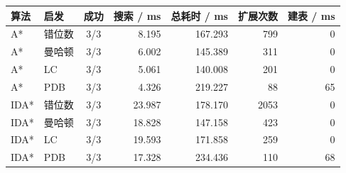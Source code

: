 \begin{tabular}{llcrrrr}
\toprule
\textbf{算法} & \textbf{启发} & \textbf{成功} & \textbf{搜索 / ms} & \textbf{总耗时 / ms} & \textbf{扩展次数} & \textbf{建表 / ms} \\
\midrule
A* & 错位数 & 3/3 & 8.195 & 167.293 & 799 & 0 \\
A* & 曼哈顿 & 3/3 & 6.002 & 145.389 & 311 & 0 \\
A* & LC & 3/3 & 5.061 & 140.008 & 201 & 0 \\
A* & PDB & 3/3 & 4.326 & 219.227 & 88 & 65 \\
IDA* & 错位数 & 3/3 & 23.987 & 178.170 & 2053 & 0 \\
IDA* & 曼哈顿 & 3/3 & 18.828 & 147.158 & 423 & 0 \\
IDA* & LC & 3/3 & 19.593 & 171.858 & 259 & 0 \\
IDA* & PDB & 3/3 & 17.328 & 234.436 & 110 & 68 \\
\bottomrule
\end{tabular}
